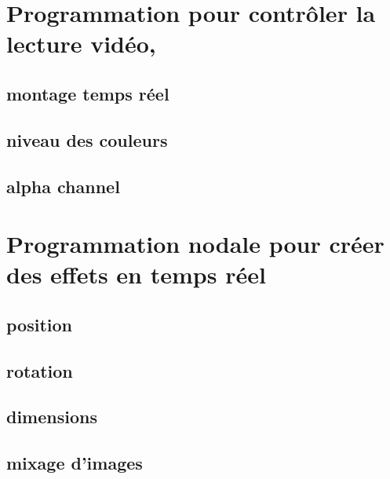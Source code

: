 \documentclass[
]{book}
\begin{document}
\hypertarget{programmation-pour-contruxf4ler-la-lecture-viduxe9o}{%
\section{Programmation pour contrôler la lecture vidéo,}\label{programmation-pour-contruxf4ler-la-lecture-viduxe9o}}

\hypertarget{montage-temps-ruxe9el}{%
\subsection{montage temps réel}\label{montage-temps-ruxe9el}}

\hypertarget{niveau-des-couleurs}{%
\subsection{niveau des couleurs}\label{niveau-des-couleurs}}

\hypertarget{alpha-channel-1}{%
\subsection{alpha channel}\label{alpha-channel-1}}

\hypertarget{programmation-nodale-pour-cruxe9er-des-effets-en-temps-ruxe9el}{%
\section{Programmation nodale pour créer des effets en temps réel}\label{programmation-nodale-pour-cruxe9er-des-effets-en-temps-ruxe9el}}

\hypertarget{position}{%
\subsection{position}\label{position}}

\hypertarget{rotation}{%
\subsection{rotation}\label{rotation}}

\hypertarget{dimensions}{%
\subsection{dimensions}\label{dimensions}}

\hypertarget{mixage-dimages}{%
\subsection{mixage d'images}\label{mixage-dimages}}
\end{document}
